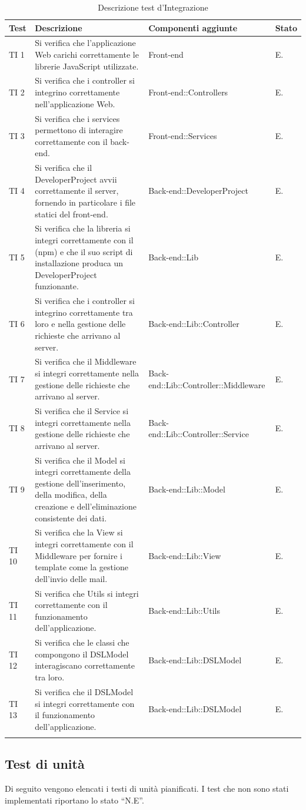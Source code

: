 	\bgroup
	\begin{longtable}[H]{|P{1cm}|P{5cm}|P{4.5cm}|P{2cm}|}
		\hline \textbf{Test} & \textbf{Descrizione} & \textbf{Componenti aggiunte} & \textbf{Stato} \\
		
		\hline TI 1 & Si verifica che l'applicazione Web carichi correttamente le librerie JavaScript utilizzate. & Front-end & E. \\
		\hline TI 2 & Si verifica che i controller si integrino correttamente nell'applicazione Web. & Front-end::Controllers & E. \\
		\hline TI 3 & Si verifica che i services permettono di interagire correttamente con il back-end. & Front-end::Services & E. \\
		\hline TI 4 & Si verifica che il DeveloperProject avvii correttamente il server, fornendo in particolare i file statici del front-end. & Back-end::DeveloperProject & E. \\
		\hline TI 5 & Si verifica che la libreria si integri correttamente con il  (npm) e che il suo script di installazione produca un DeveloperProject funzionante. & Back-end::Lib & E. \\
		\hline TI 6 & Si verifica che i controller si integrino correttamente tra loro e nella gestione delle richieste che arrivano al server. & Back-end::Lib::Controller & E. \\
		\hline TI 7 & Si verifica che il Middleware si integri correttamente nella gestione delle richieste che arrivano al server. & Back-end::Lib::Controller::Middleware & E. \\
		\hline TI 8 & Si verifica che il Service si integri correttamente nella gestione delle richieste che arrivano al server. & Back-end::Lib::Controller::Service & E. \\
		\hline TI 9 & Si verifica che il Model si integri correttamente della gestione dell'inserimento, della modifica, della creazione e dell'eliminazione consistente dei dati. & Back-end::Lib::Model & E. \\
		\hline TI 10 & Si verifica che la View si integri correttamente con il Middleware per fornire i template come la gestione dell'invio delle mail. & Back-end::Lib::View & E. \\
		\hline TI 11 & Si verifica che Utils si integri correttamente con il funzionamento dell'applicazione. & Back-end::Lib::Utils & E. \\
		\hline TI 12 & Si verifica che le classi che compongono il DSLModel interagiscano correttamente tra loro. & Back-end::Lib::DSLModel & E. \\
		\hline TI 13 & Si verifica che il DSLModel si integri correttamente con il funzionamento dell'applicazione. & Back-end::Lib::DSLModel & E. \\
		\hline

	\caption{Descrizione test d'Integrazione}
	\end{longtable}
	\egroup
	
	
	\subsection{Test di unità}
	Di seguito vengono elencati i testi di unità pianificati. I test che non sono stati implementati riportano lo stato ``N.E''.
	
	
	
	

